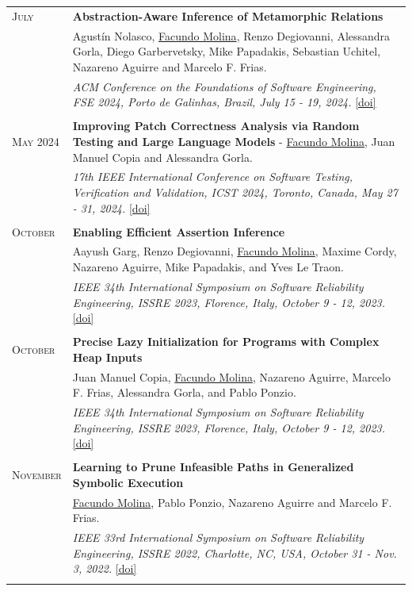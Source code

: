\documentclass[a4paper,10pt]{article} %
\begin{document}
\begin{longtable}{>{\raggedleft\arraybackslash}p{} p{}}
\textsc{July} & \textbf{Abstraction-Aware Inference of Metamorphic Relations} \\
        2024 & Agustín Nolasco, \underline{Facundo Molina}, Renzo Degiovanni, Alessandra Gorla, Diego Garbervetsky, Mike Papadakis, Sebastian Uchitel, Nazareno Aguirre and Marcelo F. Frias. \\
        & \textit{ACM Conference on the Foundations of Software Engineering, FSE 2024, Porto de Galinhas, Brazil, July 15 - 19, 2024.} \href{https://dl.acm.org/doi/10.1145/3643747}{[doi]} \\ & \\

\textsc{May} 2024  & \textbf{Improving Patch Correctness Analysis via Random Testing and Large Language Models} - \underline{Facundo Molina}, Juan Manuel Copia and Alessandra Gorla. \\
        & \textit{17th IEEE International Conference on Software Testing, Verification and Validation, ICST 2024, Toronto, Canada, May 27 - 31, 2024.} \href{https://ieeexplore.ieee.org/document/10638611/}{[doi]} \\ & \\

\textsc{October}  & \textbf{Enabling Efficient Assertion Inference} \\
        2023 & Aayush Garg, Renzo Degiovanni, \underline{Facundo Molina}, Maxime Cordy, Nazareno Aguirre, Mike Papadakis, and Yves Le Traon. \\
        & \textit{IEEE 34th International Symposium on Software Reliability Engineering, ISSRE 2023, Florence, Italy, October 9 - 12, 2023.} \href{https://doi.ieeecomputersociety.org/10.1109/ISSRE59848.2023.00039}{[doi]}\\ & \\

\textsc{October}  & \textbf{Precise Lazy Initialization for Programs with Complex Heap Inputs} \\
        2023 & Juan Manuel Copia, \underline{Facundo Molina}, Nazareno Aguirre, Marcelo F. Frias, Alessandra Gorla, and Pablo Ponzio. \\
        & \textit{IEEE 34th International Symposium on Software Reliability Engineering, ISSRE 2023, Florence, Italy, October 9 - 12, 2023.} \href{https://doi.ieeecomputersociety.org/10.1109/ISSRE59848.2023.00080}{[doi]}\\ & \\

\textsc{November}  & \textbf{Learning to Prune Infeasible Paths in Generalized Symbolic Execution} \\
        2022 & \underline{Facundo Molina}, Pablo Ponzio, Nazareno Aguirre and Marcelo F. Frias.\\
        & \textit{IEEE 33rd International Symposium on Software Reliability Engineering, ISSRE 2022, Charlotte, NC, USA, October 31 - Nov. 3, 2022.} \href{https://doi.org/10.1109/ISSRE55969.2022.00054}{[doi]} \\ & \\


\end{longtable}
\end{document}
